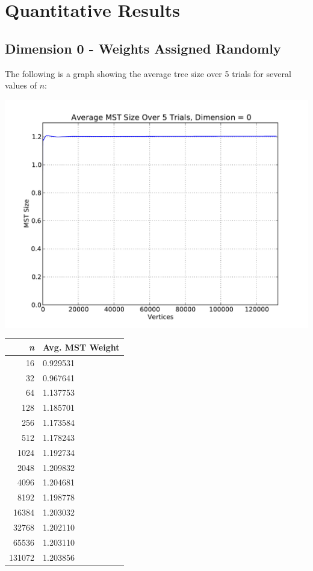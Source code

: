 \documentclass[solution, letterpaper]{cs121}
\begin{document}

\section*{Quantitative Results}
\subsection*{Dimension 0 - Weights Assigned Randomly}

The following is a graph showing the average tree size over 5 trials for several values of $n$: 
\begin{center}
\includegraphics[scale=0.6]{graphs/kruskals-dimension-0.pdf}
\begin{tabular}{ | r | l |}
\hline
\bf{\itshape{n}} & \bf{Avg. MST Weight} \\
\hline
16 & 0.929531 \\
\hline
32 & 0.967641 \\
\hline
64 & 1.137753 \\
\hline
128 & 1.185701 \\
\hline
256 & 1.173584 \\
\hline
512 & 1.178243 \\
\hline
1024 & 1.192734 \\
\hline
2048 & 1.209832 \\
\hline
4096 & 1.204681 \\
\hline
8192 & 1.198778 \\
\hline
16384 & 1.203032 \\
\hline
32768 & 1.202110 \\
\hline
65536 & 1.203110\\
\hline
131072 & 1.203856\\
\hline
\end{tabular}
\end{center}
\end{document}
